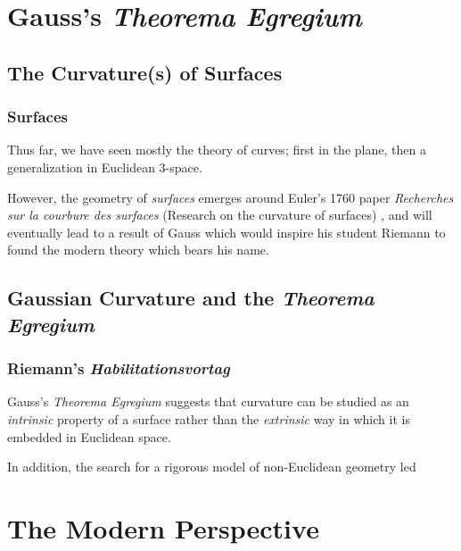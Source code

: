 \documentclass{beamer}
\theoremstyle{definition}
\begin{document}
\section{Gauss's \emph{Theorema Egregium}}

\subsection{The Curvature(s) of Surfaces}

\begin{frame}
    \frametitle{Surfaces}

    Thus far, we have seen mostly the theory of curves; first in the plane,
    then a generalization in Euclidean 3-space.

    However, the geometry of \emph{surfaces} emerges around Euler's 1760
    paper \textit{Recherches sur la courbure des surfaces} (Research on
    the curvature of surfaces) \cite{geom-diff-view}, and will eventually
    lead to a result of Gauss which would inspire his student Riemann to
    found the modern theory which bears his name.

\end{frame}

\subsection{Gaussian Curvature and the \emph{Theorema Egregium}}

\begin{frame}
    \frametitle{}

    

\end{frame}

\begin{frame}
    \frametitle{Riemann's \textit{Habilitationsvortag}}

    Gauss's \emph{Theorema Egregium} suggests that curvature can
    be studied as an \emph{intrinsic} property of a surface rather than
    the \emph{extrinsic} way in which it is embedded in Euclidean space.

    In addition, the search for a rigorous model of non-Euclidean geometry
    led 

\end{frame}

\section{The Modern Perspective}
\end{document}
